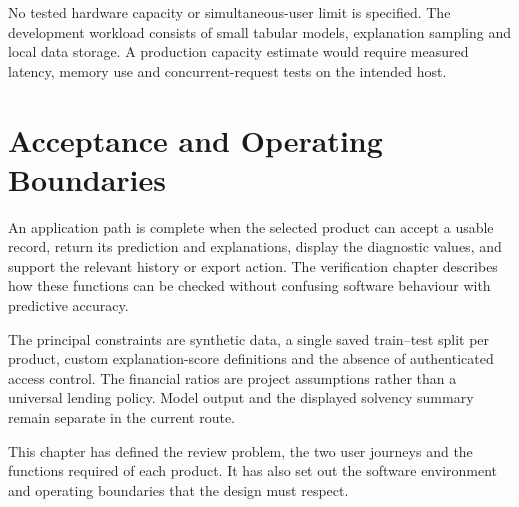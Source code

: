 No tested hardware capacity or simultaneous-user limit is specified. The development workload consists of small tabular models, explanation sampling and local data storage. A production capacity estimate would require measured latency, memory use and concurrent-request tests on the intended host.

\section{Acceptance and Operating Boundaries}
An application path is complete when the selected product can accept a usable record, return its prediction and explanations, display the diagnostic values, and support the relevant history or export action. The verification chapter describes how these functions can be checked without confusing software behaviour with predictive accuracy.

The principal constraints are synthetic data, a single saved train--test split per product, custom explanation-score definitions and the absence of authenticated access control. The financial ratios are project assumptions rather than a universal lending policy. Model output and the displayed solvency summary remain separate in the current route.

\par\medskip\noindent
This chapter has defined the review problem, the two user journeys and the functions required of each product. It has also set out the software environment and operating boundaries that the design must respect.

